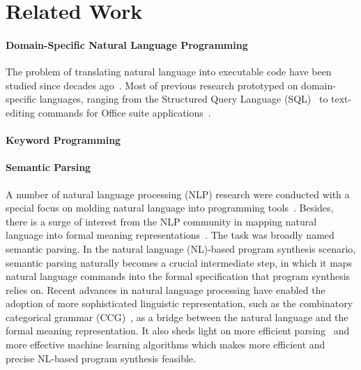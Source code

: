 \section{Related Work}

\paragraph{Domain-Specific Natural Language Programming} The problem of translating natural language into executable code have been studied since decades ago~\cite{Ballard:1979:PNL:800177.810072,Pederson-Report}. Most of previous research prototyped on domain-specific languages, ranging from the Structured Query Language (SQL)~\cite{Nihalani_NLIDB_review} to text-editing commands for Office suite applications~\cite{DBLP:journals/corr/DesaiGHJKMRR15}.

\paragraph{Keyword Programming}

\paragraph{Semantic Parsing} A number of natural language processing (NLP) research were conducted with a special focus on molding natural language into programming tools~\cite{mihalcea2006nlp,LandhauBer:2015:TUP:2820668.2820671}. Besides, 
there is a surge of interest from the NLP community in mapping natural language into formal meaning representations~\cite{Zettlemoyer05learningto,artzi2013weakly,DBLP:Poon13,Kwiatkowski:2011:LGC:2145432.2145593,liang2013learning}. The task was broadly named semantic parsing. In the natural language (NL)-based program synthesis scenario, semantic parsing naturally becomes a crucial intermediate step, in which it maps natural language commands into the formal specification that program synthesis relies on.  Recent advances in natural language processing have enabled the adoption of more sophisticated linguistic representation, such as the combinatory categorical grammar (CCG)~\cite{opac-b1080082}, as a bridge between the natural language and the formal meaning representation. It also sheds light on more efficient parsing~\cite{lewis2015joint} and more effective machine learning algorithms which makes more efficient and precise NL-based program synthesis feasible.


